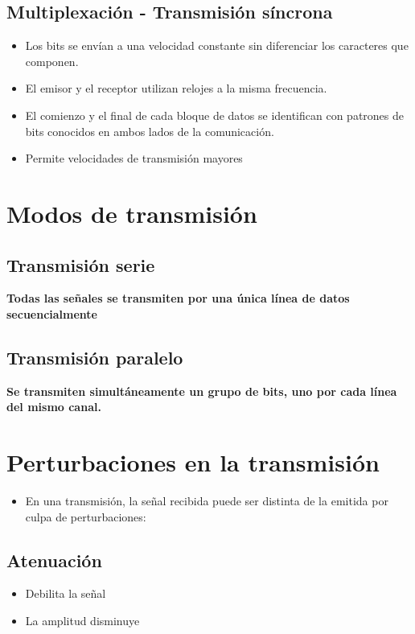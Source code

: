 \documentclass[11pt]{article}
\begin{document}
\subsection{Multiplexación - Transmisión \textbf{síncrona}}
\label{sec:org22eeccb}
\begin{itemize}
\item Los bits se envían a una velocidad constante sin diferenciar los caracteres que componen.
\item El emisor y el receptor utilizan relojes a la misma frecuencia.
\item El comienzo y el final de cada bloque de datos se identifican con patrones de bits conocidos en ambos lados de la comunicación.
\item Permite velocidades de transmisión mayores
\end{itemize}


\section{Modos de transmisión}
\label{sec:orgc46f14e}
\subsection{Transmisión \textbf{serie}}
\label{sec:org97d54a5}
\textbf{Todas las señales se transmiten por una única línea de datos secuencialmente}
\subsection{Transmisión \textbf{paralelo}}
\label{sec:orgb321ecb}
\textbf{Se transmiten simultáneamente un grupo de bits, uno por cada línea del mismo canal.}
\section{Perturbaciones en la transmisión}
\label{sec:org2589a39}
\begin{itemize}
\item En una transmisión, la señal recibida puede ser distinta de la emitida por culpa de perturbaciones:
\end{itemize}
\subsection{Atenuación}
\label{sec:org4a8944f}
\begin{itemize}
\item Debilita la señal
\item La amplitud disminuye
\end{itemize}
\end{document}
